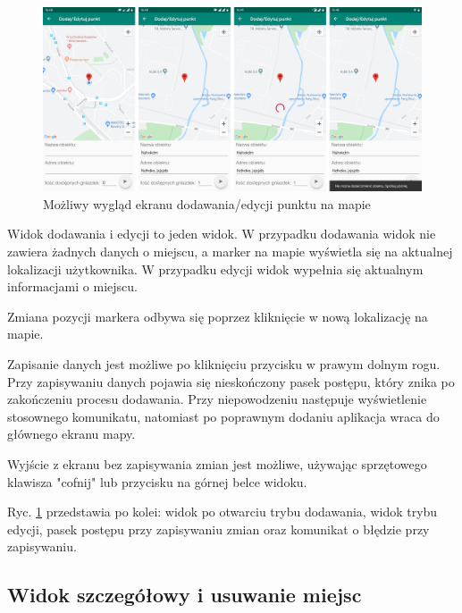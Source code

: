\documentclass[polish,polish,a4paper,12pt]{article}
\begin{document}
	\begin{figure}[H]
		\centering
		\includegraphics[width = \textwidth]{screenshot-addedit}
		\caption{Możliwy wygląd ekranu dodawania/edycji punktu na mapie}
		\label{fig:screenshotaddedit}
	\end{figure}

	Widok dodawania i edycji to jeden widok. W przypadku dodawania widok nie zawiera żadnych danych o miejscu, a marker na mapie wyświetla się na aktualnej lokalizacji użytkownika. W przypadku edycji widok wypełnia się aktualnym informacjami o miejscu.

	Zmiana pozycji markera odbywa się poprzez kliknięcie w nową lokalizację na mapie.

	Zapisanie danych jest możliwe po kliknięciu przycisku w prawym dolnym rogu. Przy zapisywaniu danych pojawia się nieskończony pasek postępu, który znika po zakończeniu procesu dodawania. Przy niepowodzeniu następuje wyświetlenie stosownego komunikatu, natomiast po poprawnym dodaniu aplikacja wraca do głównego ekranu mapy.

	Wyjście z ekranu bez zapisywania zmian jest możliwe, używając sprzętowego klawisza "cofnij" lub przycisku na górnej belce widoku.

	Ryc. \ref{fig:screenshotaddedit} przedstawia po kolei: widok po otwarciu trybu dodawania, widok trybu edycji, pasek postępu przy zapisywaniu zmian oraz komunikat o błędzie przy zapisywaniu.

	\subsection{Widok szczegółowy i usuwanie miejsc}
\end{document}
